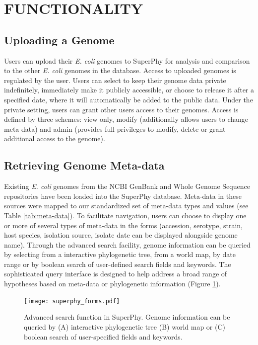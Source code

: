 \documentclass[a4paper,twoside]{article}
\begin{document}
{\section{\uppercase{Functionality}}
\label{sec:functionality}

\subsection{Uploading a Genome}

Users can upload their \textit{E. coli} genomes to SuperPhy for analysis and comparison to the other \textit{E. coli} genomes in the database.  Access to uploaded genomes is regulated by the user. Users can select to keep their genome data private indefinitely, immediately make it publicly accessible, or choose to release it after a specified date, where it will automatically be added to the public data.  Under the private setting, users can grant other users access to their genomes.  Access is defined by three schemes: view only, modify (additionally allows users to change meta-data) and admin (provides full privileges to modify, delete or grant additional access to the genome).

\subsection{Retrieving Genome Meta-data}

Existing \textit{E. coli} genomes from the NCBI GenBank and Whole Genome Sequence repositories \cite{benson2013genbank} have been loaded into the SuperPhy database. Meta-data in these sources were mapped to our standardized set of meta-data types and values (see Table \ref{tab:meta-data}). To facilitate navigation, users can choose to display one or more of several types of meta-data in the forms (accession, serotype, strain, host species, isolation source, isolate date can be displayed alongside genome name). Through the advanced search facility, genome information can be queried by selecting from a interactive phylogenetic tree, from a world map, by date range or by boolean search of user-defined search fields and keywords.  The sophisticated query interface is designed to help address a broad range of hypotheses based on meta-data or phylogenetic information (Figure \ref{fig:search}).

\begin{figure}[t]
  \vspace{-0.2cm}
  \centering
   {\texttt{[image: superphy\_forms.pdf]}}
  \caption{Advanced search function in SuperPhy. Genome information can be queried by (A) interactive phylogenetic tree (B) world map or (C) boolean search of user-specified fields and keywords.}
  \label{fig:search}
\end{figure}

}
\end{document}
